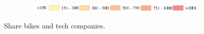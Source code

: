 \documentclass[ijgi,submit,moreauthors,pdftex]{Definitions/mdpi}
\begin{document}
\begin{figure}[H]
    \vspace{6pt}
    \begin{subfigure}{.7\textwidth}
        \includegraphics[width=\textwidth]{Figures/AppendixLegend2-eps-converted-to.pdf}
    \end{subfigure}
    \caption{Share bikes and tech companies.}
    \label{fig:BSS_companies}
\end{figure}





\end{document}
